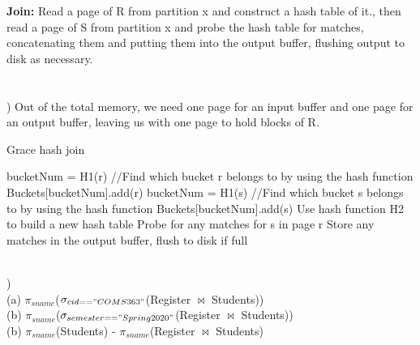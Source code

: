 \documentclass[12pt]{article}
\begin{document}
\noindent \textbf{Join:} Read a page of R from partition x and construct a hash table of it., then read a page of S from partition x and probe the hash table for matches, concatenating them and putting them into the output buffer, flushing output to disk as necessary.\\\\


\hrulefill\\


) Out of the total memory, we need one page for an input buffer and one page for an output buffer, leaving us with one page to hold blocks of R. \\
\begin{algorithm}[H]
\caption{Grace hash join}
\begin{algorithmic} [1]
\State bucketNum = H1(r) //Find which bucket r belongs to by using the hash function
\State Buckets[bucketNum].add(r)
\EndFor
\State 
{}
\State bucketNum = H1(s) //Find which bucket s belongs to by using the hash function
\State Buckets[bucketNum].add(s)
\EndFor
\State 
{}
\State Use hash function H2 to build a new hash table
\State 
{}
\State Probe for any matches for s in page r
\State Store any matches in the output buffer, flush to disk if full
\EndFor
\EndFor
\State 
\EndFor

\end{algorithmic}
\end{algorithm}


\hrulefill\\



) \\
\indent (a) {\large $\pi_{sname}$($\sigma_{cid=="COMS363"}$(Register $\bowtie$ Students)) }\\[.4em]
\indent (b) {\large $\pi_{sname}$($\sigma_{semester=="Spring2020"}$(Register $\bowtie$ Students)) }\\[.4em]
\indent (b) {\large $\pi_{sname}$(Students) - $\pi_{sname}$(Register $\bowtie$ Students) }\\[.4em]


\hrulefill\\
\pagebreak
\end{document}
